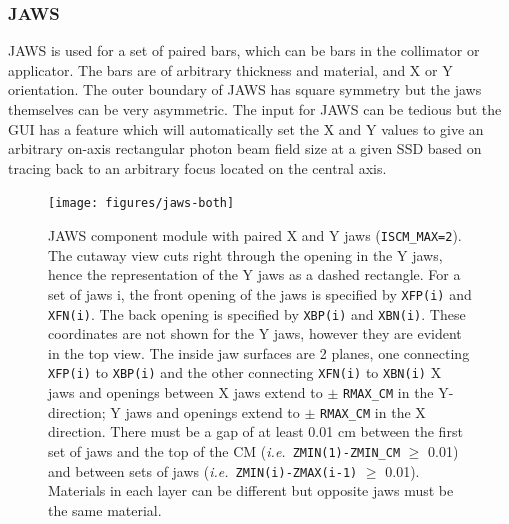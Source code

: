\documentclass[12pt,twoside]{article}
\newcommand{\ie}{{\em i.e.}}
\begin{document}

\clearpage

\begin{small}

\end{small}

\newpage


\subsubsection{JAWS}
\label{jawssect}
\renewcommand{\rightmark}{JAWS CM}

JAWS is used for a set of paired bars, which can be bars in the collimator or
applicator. The bars are of arbitrary thickness and material, and X or Y
orientation.  The outer boundary of JAWS has square symmetry but the jaws
themselves can be very asymmetric. The input for JAWS can be tedious
but the GUI has a feature which will automatically set the X and Y values
to give an arbitrary on-axis rectangular photon beam field size at a
given SSD based on tracing back to an arbitrary focus located on the
central axis.

\begin{figure}[htbp]
\label{fig_JAWSD}
\begin{center}
\leavevmode
\texttt{[image: figures/jaws-both]}
\end{center}
\caption[JAWS CM geometry]
{JAWS component module with paired X
and Y jaws ({\tt ISCM\_MAX=2}).  The cutaway view cuts right through the
opening in the Y jaws, hence the representation of the Y jaws as a dashed
rectangle.  For a set of jaws i, the front opening of the jaws
is specified by {\tt XFP(i)} and {\tt XFN(i)}.
The back opening is specified by
{\tt XBP(i)} and {\tt XBN(i)}.
These coordinates are not shown for the Y jaws,
however they are evident in the top view.  The inside jaw surfaces are 2 planes,
one connecting
{\tt XFP(i)} to {\tt XBP(i)} and the other connecting {\tt XFN(i)}
to {\tt XBN(i)}  X jaws and
openings between X jaws extend
to $\pm$ {\tt RMAX\_CM} in the Y-direction; Y jaws and openings extend
to $\pm$ {\tt RMAX\_CM} in the X
direction.  There must be a gap of at least 0.01 cm between the first
set of jaws and the top of the CM (\ie\ {\tt ZMIN(1)-ZMIN\_CM} $\geq$ 0.01) and
between sets of jaws (\ie\ {\tt ZMIN(i)-ZMAX(i-1)} $\geq$ 0.01).
Materials in each layer can be different but opposite jaws must be the
same material.}
\end{figure}
\end{document}
